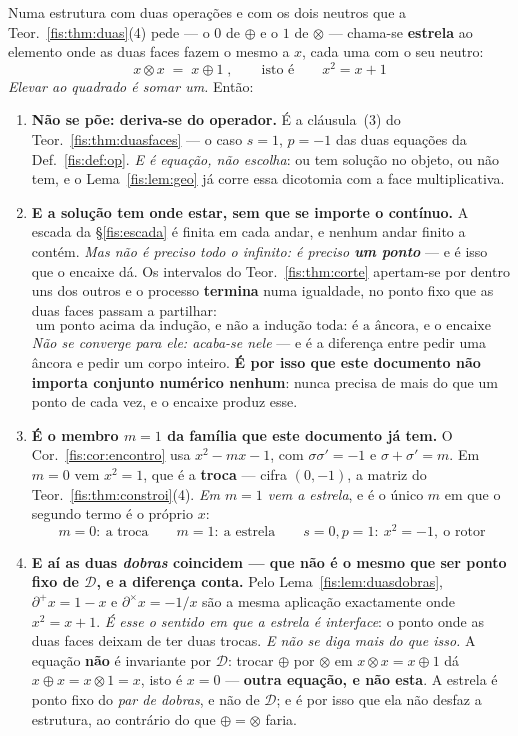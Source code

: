 \documentclass[livro.tex]{subfiles}
\begin{document}
\begin{teorema}\label{fis:thm:estrela}
Numa estrutura com duas operações e com os dois neutros que a
Teor.~\ref{fis:thm:duas}(4) pede --- o $0$ de $\oplus$ e o $1$ de $\otimes$ ---
chama-se \textbf{estrela} ao elemento onde as duas faces fazem o mesmo a $x$,
cada uma com o seu neutro:
\[
\boxed{\;x\otimes x\;=\;x\oplus 1\;,\qquad\text{isto é}\qquad x^{2}=x+1\;}
\]
\emph{Elevar ao quadrado é somar um.} Então:
\begin{enumerate}\itemsep3pt
\item[(1)] \textbf{Não se põe: deriva-se do operador.} É a cláusula~(3) do
Teor.~\ref{fis:thm:duasfaces} --- o caso $s=1$, $p=-1$ das duas equações da
Def.~\ref{fis:def:op}. \emph{E é equação, não escolha}: ou tem solução no objeto,
ou não tem, e o Lema~\ref{fis:lem:geo} já corre essa dicotomia com a face
multiplicativa.
\item[(1\,\!$'$)] \textbf{E a solução tem onde estar, sem que se importe o
contínuo.} A escada da §\ref{fis:escada} é finita em cada andar, e nenhum andar
finito a contém. \emph{Mas não é preciso todo o infinito: é preciso \textbf{um
ponto}} --- e é isso que o encaixe dá. Os intervalos do
Teor.~\ref{fis:thm:corte} apertam-se por dentro uns dos outros e o processo
\textbf{termina} numa igualdade, no ponto fixo que as duas faces passam a
partilhar:
\[
\boxed{\;\text{um ponto acima da indução, e não a indução toda: é a âncora, e o encaixe garante-a}\;}
\]
\emph{Não se converge para ele: acaba-se nele} --- e é a diferença entre pedir
uma âncora e pedir um corpo inteiro. \textbf{É por isso que este documento não
importa conjunto numérico nenhum}: nunca precisa de mais do que um ponto de cada
vez, e o encaixe produz esse.
\item[(2)] \textbf{É o membro $m=1$ da família que este documento já tem.} O
Cor.~\ref{fis:cor:encontro} usa $x^{2}-mx-1$, com $\sigma\sigma'=-1$ e
$\sigma+\sigma'=m$. Em $m=0$ vem $x^{2}=1$, que é a \textbf{troca} --- cifra
$(0,-1)$, a matriz do Teor.~\ref{fis:thm:constroi}(4). \emph{Em $m=1$ vem a
estrela}, e é o único $m$ em que o segundo termo é o próprio $x$:
\[
\boxed{\;m=0:\ \text{a troca}\qquad m=1:\ \text{a estrela}\qquad s=0,p=1:\ x^{2}=-1,\ \text{o rotor}\;}
\]
\item[(3)] \textbf{E aí as duas \emph{dobras} coincidem --- que não é o mesmo que
ser ponto fixo de $\mathcal{D}$, e a diferença conta.} Pelo
Lema~\ref{fis:lem:duasdobras}, $\partial^{+}x=1-x$ e $\partial^{\times}x=-1/x$
são a mesma aplicação exactamente onde $x^{2}=x+1$. \emph{É esse o sentido em que
a estrela é interface}: o ponto onde as duas faces deixam de ter duas trocas.
\smallskip
\emph{E não se diga mais do que isso.} A equação \textbf{não} é invariante por
$\mathcal{D}$: trocar $\oplus$ por $\otimes$ em $x\otimes x=x\oplus1$ dá
$x\oplus x=x\otimes1=x$, isto é $x=0$ --- \textbf{outra equação, e não esta}. A
estrela é ponto fixo do \emph{par de dobras}, e não de $\mathcal{D}$; e é por
isso que ela não desfaz a estrutura, ao contrário do que $\oplus=\otimes$
faria.
\end{enumerate}
\end{teorema}
\end{document}
